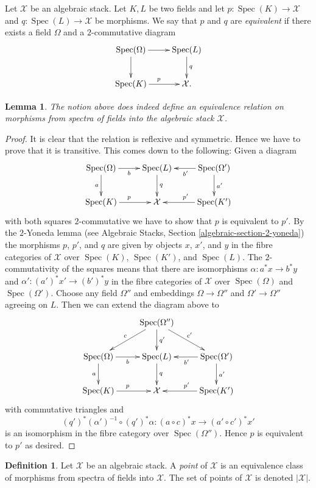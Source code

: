 \documentclass{stacks-project}
\theoremstyle{plain}
\newtheorem{lemma}[subsection]{Lemma}
\theoremstyle{definition}
\newtheorem{definition}[subsection]{Definition}
\theoremstyle{remark}
\numberwithin{equation}{subsection}
\def\Spec{\mathop{\mathrm{Spec}}}
\begin{document}
\noindent
Let $\mathcal{X}$ be an algebraic stack. Let $K, L$ be two fields
and let $p : \Spec(K) \to \mathcal{X}$ and
$q : \Spec(L) \to \mathcal{X}$ be morphisms.
We say that $p$ and $q$ are {\it equivalent} if there exists a
field $\Omega$ and a $2$-commutative diagram
$$
\xymatrix{
\Spec(\Omega) \ar[r] \ar[d] &
\Spec(L) \ar[d]^q \\
\Spec(K) \ar[r]^p &
\mathcal{X}.
}
$$

\begin{lemma}
\label{lemma-equivalence}
The notion above does indeed define an equivalence relation on
morphisms from spectra of fields into the algebraic stack $\mathcal{X}$.
\end{lemma}

\begin{proof}
It is clear that the relation is reflexive and symmetric.
Hence we have to prove that it is transitive. This comes down
to the following: Given a diagram
$$
\xymatrix{
\Spec(\Omega) \ar[r]_b \ar[d]_a &
\Spec(L) \ar[d]^q & \Spec(\Omega') \ar[l]^{b'} \ar[d]^{a'} \\
\Spec(K) \ar[r]^p &
\mathcal{X} &
\Spec(K') \ar[l]_{p'}
}
$$
with both squares $2$-commutative we have to show that $p$ is equivalent to
$p'$. By the $2$-Yoneda lemma (see
Algebraic Stacks, Section \ref{algebraic-section-2-yoneda})
the morphisms $p$, $p'$, and $q$ are given by objects
$x$, $x'$, and $y$ in the fibre categories of $\mathcal{X}$ over
$\Spec(K)$, $\Spec(K')$, and $\Spec(L)$. The
$2$-commutativity of the squares means that there are isomorphisms
$\alpha : a^*x \to b^*y$ and $\alpha' : (a')^*x' \to (b')^*y$
in the fibre categories
of $\mathcal{X}$ over $\Spec(\Omega)$ and $\Spec(\Omega')$.
Choose any field $\Omega''$ and embeddings
$\Omega \to \Omega''$ and $\Omega' \to \Omega''$ agreeing on $L$.
Then we can extend the diagram above to
$$
\xymatrix{
& \Spec(\Omega'') \ar[ld]_c \ar[d]^{q'} \ar[rd]^{c'} \\
\Spec(\Omega) \ar[r]_b \ar[d]_a &
\Spec(L) \ar[d]^q & \Spec(\Omega') \ar[l]^{b'} \ar[d]^{a'} \\
\Spec(K) \ar[r]^p &
\mathcal{X} &
\Spec(K') \ar[l]_{p'}
}
$$
with commutative triangles and
$$
(q')^*(\alpha')^{-1} \circ (q')^*\alpha :
(a \circ c)^*x
\longrightarrow
(a' \circ c')^*x'
$$
is an isomorphism in the fibre category over $\Spec(\Omega'')$.
Hence $p$ is equivalent to $p'$ as desired.
\end{proof}

\begin{definition}
\label{definition-points}
Let $\mathcal{X}$ be an algebraic stack.
A {\it point} of $\mathcal{X}$ is an equivalence class of morphisms
from spectra of fields into $\mathcal{X}$.
The set of points of $\mathcal{X}$ is denoted $|\mathcal{X}|$.
\end{definition}
\end{document}
